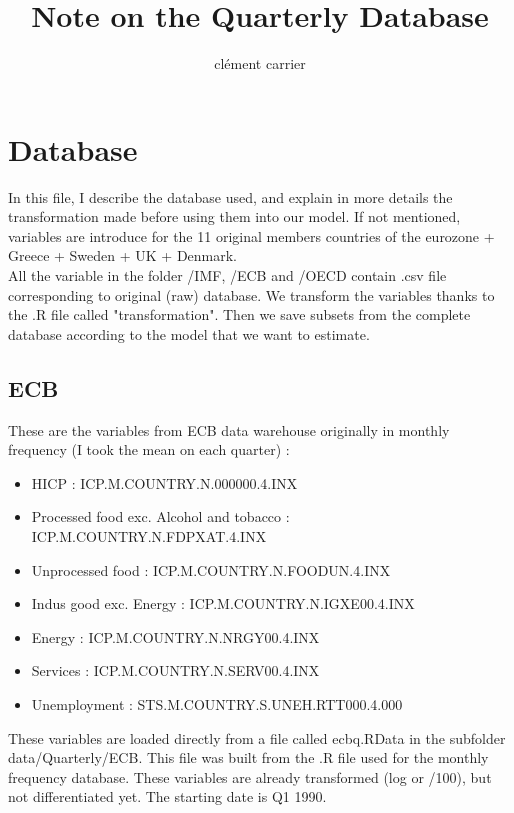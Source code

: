 \documentclass[11pt,a4paper]{article}
\title{Note on the Quarterly Database}
\author{clément carrier}
\begin{document}
\maketitle

\section{Database}

In this file, I describe the database used, and explain in more details the transformation made before using them into our model. If not mentioned, variables are introduce for the 11 original members countries of the eurozone + Greece + Sweden + UK + Denmark.\\

All the variable in the folder /IMF, /ECB and /OECD contain .csv file corresponding to original (raw) database. We transform the variables thanks to the .R file called "transformation". Then we save subsets from the complete database according to the model that we want to estimate. 




\subsection{ECB}

These are the variables from ECB data warehouse originally in monthly frequency (I took the mean on each quarter) : 
\begin{itemize}
\item HICP : ICP.M.COUNTRY.N.000000.4.INX
\item Processed food exc. Alcohol and tobacco : ICP.M.COUNTRY.N.FDPXAT.4.INX
\item Unprocessed food	: ICP.M.COUNTRY.N.FOODUN.4.INX
\item Indus good exc. Energy : ICP.M.COUNTRY.N.IGXE00.4.INX
\item Energy	:	ICP.M.COUNTRY.N.NRGY00.4.INX
\item Services	:	ICP.M.COUNTRY.N.SERV00.4.INX
\item Unemployment : STS.M.COUNTRY.S.UNEH.RTT000.4.000
\end{itemize}

\vspace{0.5cm}

These variables are loaded directly from a file called ecbq.RData in the subfolder data/Quarterly/ECB. This file was built from the .R file used for the monthly frequency database. These variables are already transformed (log or /100), but not differentiated yet. The starting date is Q1 1990. \\
\end{document}
